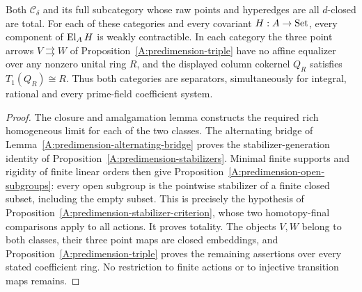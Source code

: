 \begin{theorem}
\label{A:predimension-total}
Both $\mathcal C_\delta$ and its full subcategory whose raw points
and hyperedges are all $d$-closed are total. For each of these
categories and every covariant $H:A\to\mathrm{Set}$, every component of
$\operatorname{El}_AH$ is weakly contractible. In each category the three point
arrows $V\rightrightarrows W$ of
Proposition~\ref{A:predimension-triple} have no affine equalizer
over any nonzero unital ring $R$, and the displayed column cokernel
$Q_R$ satisfies $T_1(Q_R)\cong R$. Thus both categories are
separators, simultaneously for integral, rational and every prime-field
coefficient system.
\end{theorem}
\begin{proof}
The closure and amalgamation lemma constructs the required rich
homogeneous limit for each of the two classes. The alternating
bridge of Lemma~\ref{A:predimension-alternating-bridge} proves
the stabilizer-generation identity of
Proposition~\ref{A:predimension-stabilizers}. Minimal finite
supports and rigidity of finite linear orders then give
Proposition~\ref{A:predimension-open-subgroups}: every open
subgroup is the pointwise stabilizer of a finite closed subset,
including the empty subset. This is precisely the hypothesis of
Proposition~\ref{A:predimension-stabilizer-criterion}, whose two
homotopy-final comparisons apply to all actions. It proves totality.
The objects $V,W$ belong to both classes, their three point maps
are closed embeddings, and
Proposition~\ref{A:predimension-triple} proves the remaining
assertions over every stated coefficient ring. No restriction to
finite actions or to injective transition maps remains.
\end{proof}
